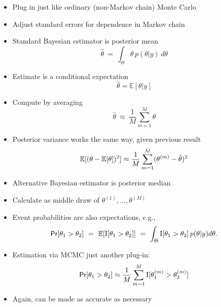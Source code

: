 \documentclass[10pt]{report}
\begin{document}
%
\begin{itemize}
\item Plug in just like ordinary (non-Markov chain) Monte Carlo
\item Adjust standard errors for dependence in Markov chain
\end{itemize}


%
\begin{itemize}
\item Standard Bayesian estimator is posterior mean
\[
\hat{\theta}  \ =  \ \int_{\Theta} \theta \, p(\theta|y) \, d\theta
\]
\item Estimate is a conditional expectation
\[
\hat{\theta} = \mathbb{E}[\theta|y]
\]
\item Compute by averaging
\[
\hat{\theta} \ \approx \ \frac{1}{M} \sum_{m=1}^M \theta
\]
\end{itemize}


%
\begin{itemize}
\item Posterior variance works the same way, given previous result
\[
\mathbb{E}[(\theta - \mathbb{E}[\theta])^2]
\approx \frac{1}{M} \sum_{m=1}^M (\theta^{(m)} - \hat{\theta})^2
\]
\end{itemize}


%
\begin{itemize}
\item Alternative Bayesian estimator is posterior median
\item Calculate as middle draw of $\theta^{(1)}, \ldots,
  \theta^{(M)}$
\end{itemize}


%
\begin{itemize}
\item Event probabilities are also expectations, e.g.,
\[
\text{\sf Pr}[\theta_1 > \theta_2]
\ = \ \mathbb{E}[\text{I}[\theta_1 > \theta_2]]
\ = \ \int_{\Theta} \text{I}[\theta_1 > \theta_2] \, p(\theta|y) d\theta.
\]
\item Estimation via MCMC just another plug-in:
\[
\text{\sf Pr}[\theta_1 > \theta_2] \approx 
\frac{1}{M} \sum_{m=1}^M \text{I}[\theta_1^{(m)} > \theta_2^{(m)}]
\]
\item Again, can be made as accurate as necessary
\end{itemize}
\end{document}
